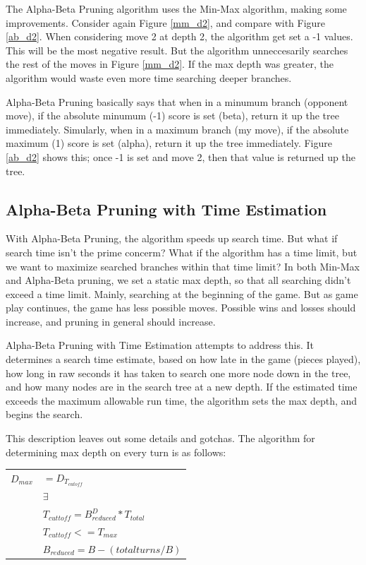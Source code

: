 \documentclass[12pt]{article}
\begin{document}
The Alpha-Beta Pruning algorithm uses the Min-Max algorithm, making some improvements. Consider again Figure \ref{mm_d2}, and compare with Figure \ref{ab_d2}. When considering move 2 at depth 2, the algorithm get set a -1 values. This will be the most negative result. But the algorithm unneccesarily searches the rest of the moves in Figure \ref{mm_d2}. If the max depth was greater, the algorithm would waste even more time
searching deeper branches.

Alpha-Beta Pruning basically says that when in a minumum branch (opponent move), if the absolute minumum (-1) score is set (beta), return it up the tree immediately. Simularly, when in a maximum branch (my 
move),  if the absolute maximum (1) score is set (alpha), return it up the tree immediately. Figure \ref{ab_d2}
shows this; once -1 is set and move 2, then that value is returned up the tree.


\subsection{Alpha-Beta Pruning with Time Estimation}
With Alpha-Beta Pruning, the algorithm speeds up search time. But what if search time isn't the prime
concerm? What if the algorithm has a time limit, but we want to maximize searched branches within that time
limit? In both Min-Max and Alpha-Beta pruning, we set a static max depth, so that all searching didn't exceed
a time limit. Mainly, searching at the beginning of the game. But as game play continues, the game has less
possible moves. Possible wins and losses should increase, and pruning in general should increase. 

Alpha-Beta Pruning with Time Estimation attempts to address this. It determines a search time estimate, 
based on how late in the game (pieces played), how long in raw seconds it has taken to search one more
node down in the tree, and how many nodes are in the search tree at a new depth. If the estimated time
exceeds the maximum allowable run time, the algorithm sets the max depth, and begins the search.

This description leaves out some details and gotchas. The algorithm for determining max depth on every
turn is as follows:

\begin{tabular}{ r l }
	\(D_{max}\)			& \(= D_{T_{cutoff}}\) 						\\
						& \(\exists\) \\
						& \( T_{cuttoff} = B_{reduced}^{D} * T_{total}\)\\
						& \( T_{cuttoff} <= T_{max}\)\\
						& \(B_{reduced}  = B - ( total turns / B) \)
\end{tabular} \\
\end{document}
